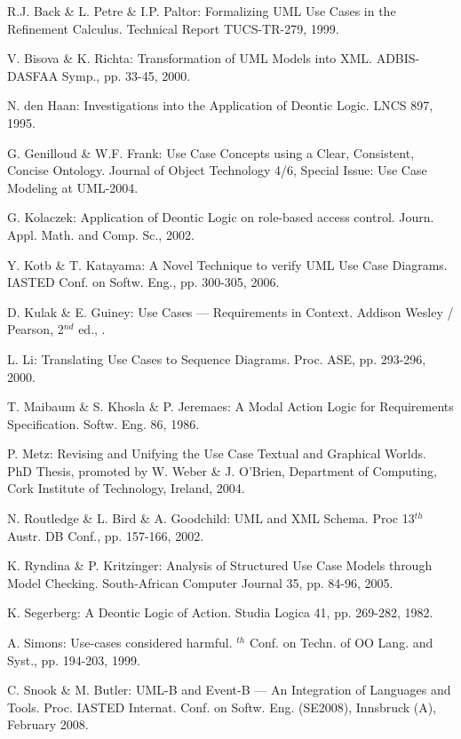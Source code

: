 \begin{thebibliography}{}

R.J. Back \& L. Petre \& I.P. Paltor: 
\newblock Formalizing UML Use Cases in the Refinement Calculus. 
\newblock Technical Report TUCS-TR-279, 1999.		

V. Bisova \& K. Richta: 
\newblock Transformation of UML Models into XML. 
\newblock ADBIS-DASFAA Symp., pp. 33-45, 2000.

N. den Haan: 
\newblock Investigations into the Application of Deontic Logic. 
\newblock LNCS 897, 1995.		

G. Genilloud \& W.F. Frank:
\newblock Use Case Concepts using a Clear, Consistent, Concise Ontology. 
\newblock Journal of Object Technology 4/6, 
\newblock Special Issue: Use Case Modeling  at UML-2004.

G. Kolaczek: 
\newblock Application of Deontic Logic on role-based access control. 
\newblock Journ. Appl. Math. and Comp. Sc., 2002.		

Y. Kotb \& T. Katayama: 
\newblock A Novel Technique to verify UML Use Case Diagrams. 
\newblock IASTED Conf. on Softw. Eng., pp. 300-305, 2006.
		
D. Kulak \& E. Guiney: 
\newblock Use Cases --- Requirements in Context. 
\newblock Addison Wesley / Pearson, 2$^{nd}$ ed., 
.

L. Li: 
\newblock Translating Use Cases to Sequence Diagrams. 
\newblock Proc. ASE, pp. 293-296, 2000.

T. Maibaum \& S. Khosla \& P. Jeremaes: 
\newblock A Modal Action Logic for Requirements Specification. 
\newblock Softw. Eng. 86, 1986.		

P. Metz:
\newblock Revising and Unifying the Use Case Textual and 
          Graphical Worlds.
\newblock PhD Thesis, promoted by W. Weber \& J. O'Brien,
\newblock Department of Computing,
\newblock Cork Institute of Technology, 
\newblock Ireland, 2004.

N. Routledge \& L. Bird \& A. Goodchild: 
\newblock UML and XML Schema. 
\newblock Proc 13$^{th}$ Austr. DB Conf., 
\newblock pp. 157-166, 2002.

K. Ryndina \& P. Kritzinger: 
\newblock Analysis of Structured Use Case Models
 through Model Checking. 
\newblock South-African Computer Journal 35,
\newblock pp. 84-96, 2005.

K. Segerberg: 
\newblock A Deontic Logic of Action. 
\newblock Studia Logica 41, 
\newblock pp. 269-282, 1982.		

A. Simons: 
\newblock Use-cases considered harmful. 
$^{th}$ Conf. on Techn. of OO Lang. and Syst., 
\newblock pp. 194-203, 1999.

C. Snook \& M. Butler:
\newblock UML-B and Event-B --- An Integration of Languages and Tools.
\newblock Proc. IASTED Internat. Conf. on Softw. Eng. (SE2008),
\newblock Innsbruck (A), February 2008.

\end{thebibliography}


